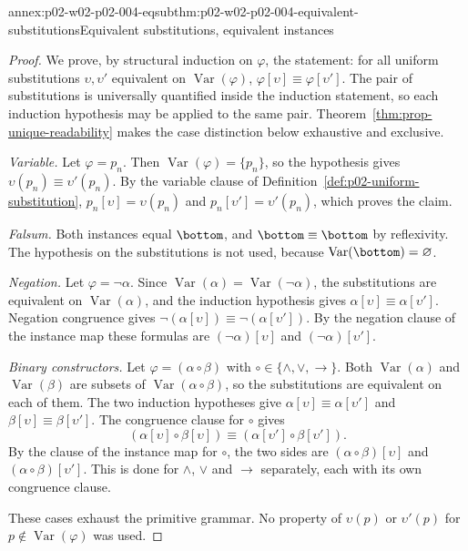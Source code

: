 \begin{annexitem}{annex:p02-w02-p02-004-eqsub}{thm:p02-w02-p02-004-equivalent-substitutions}{Equivalent substitutions, equivalent instances}
\begin{proof}
We prove, by structural induction on \(\varphi\), the statement: for all
uniform substitutions \(\upsilon,\upsilon'\) equivalent on
\(\operatorname{Var}(\varphi)\),
\(\varphi[\upsilon]\equiv\varphi[\upsilon']\).  The pair of substitutions is
universally quantified inside the induction statement, so each induction
hypothesis may be applied to the same pair.
Theorem~\ref{thm:prop-unique-readability} makes the case distinction below
exhaustive and exclusive.

\emph{Variable.}  Let \(\varphi=p_n\).  Then
\(\operatorname{Var}(\varphi)=\{p_n\}\), so the hypothesis gives
\(\upsilon(p_n)\equiv\upsilon'(p_n)\).  By the variable clause of
Definition~\ref{def:p02-uniform-substitution},
\(p_n[\upsilon]=\upsilon(p_n)\) and \(p_n[\upsilon']=\upsilon'(p_n)\), which
proves the claim.

\emph{Falsum.}  Both instances equal \(\bottom\), and
\(\bottom\equiv\bottom\) by reflexivity.  The hypothesis on the
substitutions is not used, because \(\operatorname{Var}(\bottom)=\varnothing\).

\emph{Negation.}  Let \(\varphi=\neg\alpha\).  Since
\(\operatorname{Var}(\alpha)=\operatorname{Var}(\neg\alpha)\), the
substitutions are equivalent on \(\operatorname{Var}(\alpha)\), and the
induction hypothesis gives \(\alpha[\upsilon]\equiv\alpha[\upsilon']\).
Negation congruence gives
\(\neg(\alpha[\upsilon])\equiv\neg(\alpha[\upsilon'])\).  By the negation
clause of the instance map these formulas are
\((\neg\alpha)[\upsilon]\) and \((\neg\alpha)[\upsilon']\).

\emph{Binary constructors.}  Let \(\varphi=(\alpha\circ\beta)\) with
\(\circ\in\{\land,\lor,\to\}\).  Both \(\operatorname{Var}(\alpha)\) and
\(\operatorname{Var}(\beta)\) are subsets of
\(\operatorname{Var}(\alpha\circ\beta)\), so the substitutions are
equivalent on each of them.  The two induction hypotheses give
\(\alpha[\upsilon]\equiv\alpha[\upsilon']\) and
\(\beta[\upsilon]\equiv\beta[\upsilon']\).  The congruence clause for
\(\circ\) gives
\[
 (\alpha[\upsilon]\circ\beta[\upsilon])
   \equiv(\alpha[\upsilon']\circ\beta[\upsilon']).
\]
By the clause of the instance map for \(\circ\), the two sides are
\((\alpha\circ\beta)[\upsilon]\) and \((\alpha\circ\beta)[\upsilon']\).
This is done for \(\land\), \(\lor\) and \(\to\) separately, each with its
own congruence clause.

These cases exhaust the primitive grammar.  No property of
\(\upsilon(p)\) or \(\upsilon'(p)\) for \(p\notin\operatorname{Var}(\varphi)\)
was used.
\end{proof}
\end{annexitem}

